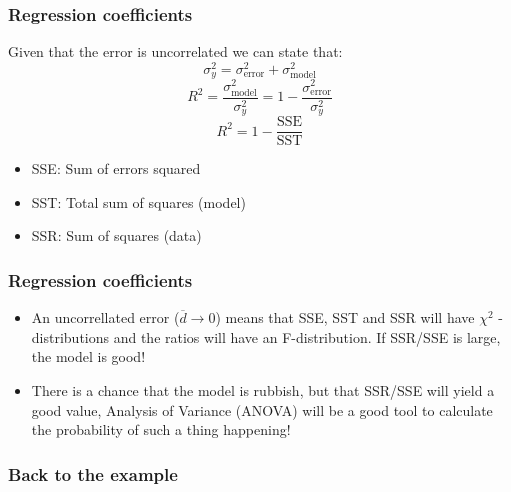 \begin{frame}[fragile] 
  \frametitle{Regression coefficients}
  Given that the error is uncorrelated we can state that:
    \[
      \sigma^2_y = \sigma^2_\text{error}+\sigma^2_\text{model}
    \]
    \[
      R^2 = \frac{\sigma^2_\text{model}}{\sigma^2_y} = 1 - \frac{\sigma^2_\text{error}}{\sigma^2_y}
    \]
    \[
      R^2 = 1 - \frac{\text{SSE}}{\text{SST}}
    \]
    \begin{itemize}
      \item SSE: Sum of errors squared
      \item SST: Total sum of squares (model)
      \item SSR: Sum of squares (data)
   \end{itemize}
\end{frame}

\begin{frame}[fragile] 
  \frametitle{Regression coefficients}
    \begin{itemize}
      \item An uncorrellated error ($\overline{d} \rightarrow 0$) means that SSE, SST and SSR will have $\chi^2$ -distributions and the ratios will have an F-distribution. If SSR/SSE is large, the model is good!
      \item There is a chance that the model is rubbish, but that SSR/SSE will yield a good value, Analysis of Variance (ANOVA) will be a good tool to calculate the probability of such a thing happening!
   \end{itemize}
\end{frame}

\begin{frame}[fragile] 
  \frametitle{Back to the example}
\end{frame}


